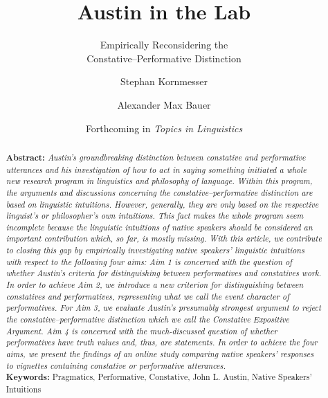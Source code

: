 \documentclass[egregdoesnotlikesansseriftitles,12pt]{scrartcl}
\title{Austin in the Lab}
\subtitle{Empirically Reconsidering the\\Constative--Performative Distinction}
\author[1*]{Stephan Kornmesser}
\author[1]{Alexander Max Bauer}
\affil[1]{ Department of Philosophy, University of Oldenburg, Germany}
\affil[*]{ Corresponding Author, E-Mail: \href{mailto:stephan.kornmesser@uni-oldenburg.de}{stephan.kornmesser@uni-oldenburg.de}}
\date{\small Forthcoming in \textit{Topics in Linguistics}}
\begin{document}
\maketitle

\vspace{\fill}
\begin{abstract}
   \noindent\textbf{Abstract:} \textit{Austin's groundbreaking distinction between constative and performative utterances and his investigation of how to act in saying something initiated a whole new research program in linguistics and philosophy of language. Within this program, the arguments and discussions concerning the constative--performative distinction are based on linguistic intuitions. However, generally, they are only based on the respective linguist's or philosopher's own intuitions. This fact makes the whole program seem incomplete because the linguistic intuitions of native speakers should be considered an important contribution which, so far, is mostly missing. With this article, we contribute to closing this gap by empirically investigating native speakers' linguistic intuitions with respect to the following four aims: Aim 1 is concerned with the question of whether Austin's criteria for distinguishing between performatives and constatives work. In order to achieve Aim 2, we introduce a new criterion for distinguishing between constatives and performatives, representing what we call the event character of performatives. For Aim 3, we evaluate Austin's presumably strongest argument to reject the constative--performative distinction which we call the Constative Expositive Argument. Aim 4 is concerned with the much-discussed question of whether performatives have truth values and, thus, are statements. In order to achieve the four aims, we present the findings of an online study comparing native speakers' responses to vignettes containing constative or performative utterances.}\\[2ex]
   \textbf{Keywords:} Pragmatics, Performative, Constative, John L. Austin, Native Speakers' Intuitions
\end{abstract}


\clearpage
\end{document}
